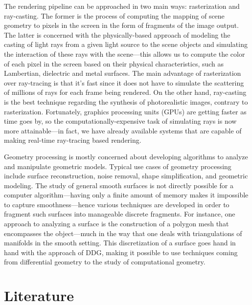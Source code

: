 \documentclass[11pt,reqno]{amsart}
\theoremstyle{definition}
\begin{document}
The rendering pipeline can be approached in two main ways: rasterization and ray-casting. The former
is the process of computing the mapping of scene geometry to pixels in the screen in the form of
fragments of the image output. The latter is concerned with the physically-based approach of
modeling the casting of light rays from a given light source to the scene objects and simulating
the interaction of these rays with the scene---this allows us to compute the color of each pixel in
the screen based on their physical characteristics, such as Lambertian, dielectric and metal
surfaces. The main advantage of rasterization over ray-tracing is that it's fast since it does not
have to simulate the scattering of millions of rays for each frame being rendered. On the other
hand, ray-casting is the best technique regarding the synthesis of photorealistic images, contrary
to rasterization. Fortunately, graphics processing units (GPUs) are getting faster as time goes by,
so the computationally-expensive task of simulating rays is now more attainable---in fact, we have
already available systems that are capable of making real-time ray-tracing based rendering.

Geometry processing is mostly concerned about developing algorithms to analyze and manipulate
geometric models. Typical use cases of geometry processing include surface reconstruction, noise
removal, shape simplification, and geometric modeling. The study of general smooth surfaces is not
directly possible for a computer algorithm---having only a finite amount of memory makes it
impossible to capture smoothness---hence various techniques are developed in order to fragment such
surfaces into manageable discrete fragments. For instance, one approach to analyzing a surface is
the construction of a polygon mesh that encompasses the object---much in the way that one deals with
triangulations of manifolds in the smooth setting. This discretization of a surface goes hand in
hand with the approach of DDG, making it possible to use techniques coming from differential
geometry to the study of computational geometry.

\section{Literature}
\end{document}
